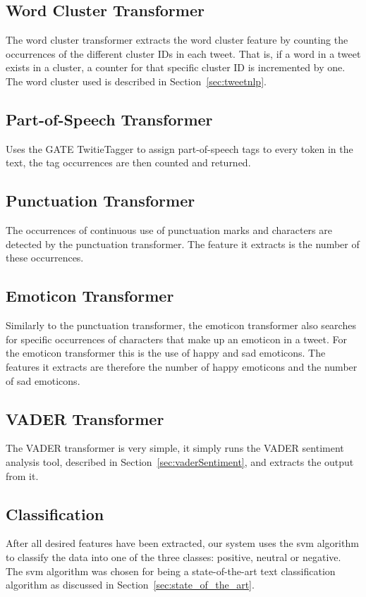 \subsection*{Word Cluster Transformer}
The word cluster transformer extracts the word cluster feature by counting the occurrences of the different cluster IDs in each tweet. That is, if a word in a tweet exists in a cluster, a counter for that specific cluster ID is incremented by one. The word cluster used is described in Section~\ref{sec:tweetnlp}.

\subsection*{Part-of-Speech Transformer}
Uses the GATE TwitieTagger to assign part-of-speech tags to every token in the text, the tag occurrences are then counted and returned.

\subsection*{Punctuation Transformer}
The occurrences of continuous use of punctuation marks and characters are detected by the punctuation transformer. The feature it extracts is the number of these occurrences. 

\subsection*{Emoticon Transformer}
Similarly to the punctuation transformer, the emoticon transformer also searches for specific occurrences of characters that make up an emoticon in a tweet. For the emoticon transformer this is the use of happy and sad emoticons. The features it extracts are therefore the number of happy emoticons and the number of sad emoticons.

\subsection*{VADER Transformer}
The VADER transformer is very simple, it simply runs the VADER sentiment analysis tool, described in Section~\ref{sec:vaderSentiment}, and extracts the output from it.


\subsection{Classification}
\label{sec:arch_classification}
After all desired features have been extracted, our system uses the \ac{svm} algorithm to classify the data into one of the three classes: positive, neutral or negative. The \ac{svm} algorithm was chosen for being a state-of-the-art text classification algorithm as discussed in Section~\ref{sec:state_of_the_art}.  \\


